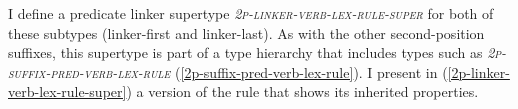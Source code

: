 I define a predicate linker supertype \textit{\textsc{2p-linker-verb-lex-rule-super}} for both of these subtypes (linker-first and linker-last). As with the other second-position suffixes, this supertype is part of a type hierarchy that includes types such as \textsc{\textit{2p-suffix-pred-verb-lex-rule}} (\ref{2p-suffix-pred-verb-lex-rule}). I present in (\ref{2p-linker-verb-lex-rule-super}) a version of the rule that shows its inherited properties.

\ex \label{2p-linker-verb-lex-rule-super}
\xe

